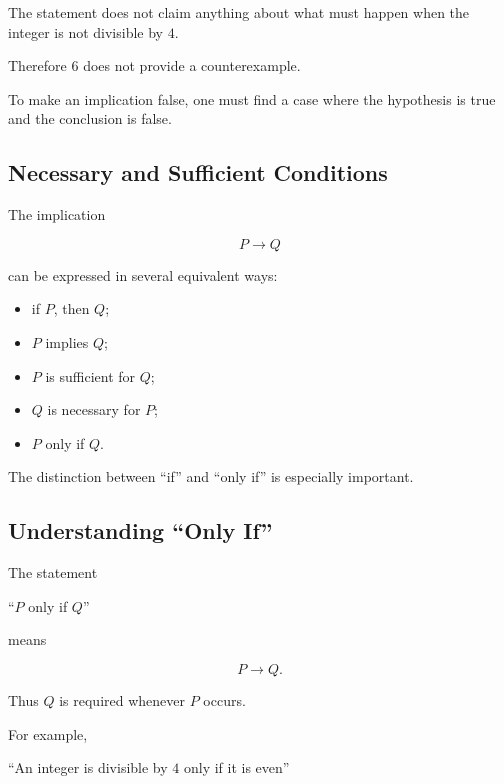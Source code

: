 The statement does not claim anything about what must happen when the integer
is not divisible by \(4\).

Therefore \(6\) does not provide a counterexample.

To make an implication false, one must find a case where the hypothesis is
true and the conclusion is false.

\subsection{Necessary and Sufficient Conditions}
\label{subsec:necessary-sufficient}

The implication

\[ P\to Q \]

can be expressed in several equivalent ways:

\begin{itemize}
    \item if \(P\), then \(Q\);
    \item \(P\) implies \(Q\);
    \item \(P\) is sufficient for \(Q\);
    \item \(Q\) is necessary for \(P\);
    \item \(P\) only if \(Q\).
\end{itemize}

The distinction between ``if'' and ``only if'' is especially important.

\subsection{Understanding ``Only If''}
\label{subsec:only-if}

The statement

\begin{center}
``\(P\) only if \(Q\)''
\end{center}

means

\[ P\to Q. \]

Thus \(Q\) is required whenever \(P\) occurs.

For example,

\begin{center}
``An integer is divisible by \(4\) only if it is even''
\end{center}

